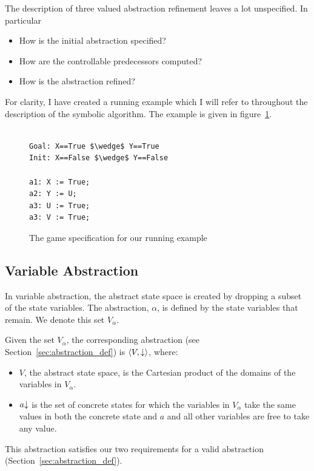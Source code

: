 The description of three valued abstraction refinement leaves a lot unspecified. In particular

\begin{itemize}
    \item How is the initial abstraction specified?
    \item How are the controllable predecessors computed?
    \item How is the abstraction refined?
\end{itemize}

For clarity, I have created a running example which I will refer to throughout the description of the symbolic algorithm. The example is given in figure~\ref{fig:running_example}.

\begin{figure}
    \begin{lstlisting}[mathescape]

Goal: X==True $\wedge$ Y==True
Init: X==False $\wedge$ Y==False

a1: X := True;
a2: Y := U;
a3: U := True;
a3: V := True;

\end{lstlisting}
\caption{The game specification for our running example}
\label{fig:running_example}
\end{figure}

\subsection{Variable Abstraction}

In variable abstraction, the abstract state space is created by dropping a subset of the state variables. The abstraction, $\alpha$, is defined by the state variables that remain. We denote this set $V_{\alpha}$.

Given the set $V_{\alpha}$, the corresponding abstraction (see Section~\ref{sec:abstraction_def}) is $\langle V, \mathord{\downarrow} \rangle$, where:
\begin{itemize}
    \item $V$, the abstract state space, is the Cartesian product of the domains of the variables in $V_{\alpha}$.
    \item $a\mathord{\downarrow}$ is the set of concrete states for which the variables in $V_{\alpha}$ take the same values in both the concrete state and $a$ and all other variables are free to take any value.
\end{itemize}

This abstraction satisfies our two requirements for a valid abstraction (Section~\ref{sec:abstraction_def}). 

